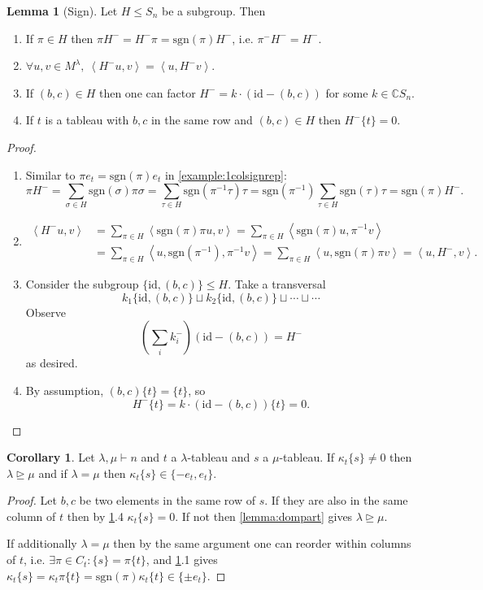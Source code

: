 \documentclass[a4paper]{article}
\newcommand{\sgn}{\text{sgn}}
\newcommand{\la}{\left\langle}
\newcommand{\ra}{\right\rangle}
\newcommand{\C}{\mathbb{C}}
\newcommand{\id}{\text{id}}
\theoremstyle{definition}
\newtheorem{lemma}[defn]{Lemma}
\newtheorem{coro}[defn]{Corollary}
\begin{document}
\begin{lemma}[Sign]
\label{lemma:sign}
Let $H\leq S_n$ be a subgroup. Then
\begin{enumerate}
\item If $\pi\in H$ then $\pi H^-=H^-\pi=\sgn(\pi)H^-$, i.e. $\pi^-H^-=H^-$.
\item $\forall u,v\in M^\lambda,\ \la H^-u,v\ra=\la u,H^-v\ra$.
\item If $(b,c)\in H$ then one can factor $H^-=k\cdot (\id-(b,c))$ for some $k\in\C S_n$.
\item If $t$ is a tableau with $b,c$ in the same row and $(b,c)\in H$ then $H^-\{t\}=0$.
\end{enumerate}
\end{lemma}
\begin{proof}
\begin{enumerate}
\item Similar to $\pi e_t=\sgn(\pi)e_t$ in \ref{example:1colsignrep}:
\[
\pi H^-=\sum_{\sigma\in H}\sgn(\sigma)\pi\sigma=\sum_{\tau\in H}\sgn(\pi^{-1}\tau)\tau=\sgn(\pi^{-1})\sum_{\tau\in H} \sgn(\tau)\tau=\sgn(\pi)H^-.
\]
\item \[
\begin{aligned}
\la H^-u,v \ra&=\sum_{\pi\in H}\la \sgn(\pi)\pi u,v \ra=\sum_{\pi\in H}\la\sgn(\pi)u,\pi^{-1}v\ra\\
&=\sum_{\pi\in H}\la u,\sgn(\pi^{-1}),\pi^{-1}v\ra=\sum_{\pi\in H}\la u,\sgn(\pi)\pi v\ra=\la u,H^-,v\ra.
\end{aligned}
\]
\item Consider the subgroup $\{\id,(b,c)\}\leq H$. Take a transversal
\[
k_1\{\id,(b,c)\}\sqcup k_2\{\id,(b,c)\}\sqcup\cdots\sqcup\cdots
\]
Observe
\[
\left(\sum_i k_i^-\right)(\id-(b,c))=H^-
\]
as desired.
\item By assumption, $(b,c)\{t\}=\{t\}$, so
\[
H^-\{t\}=k\cdot(\id-(b,c))\{t\}=0.
\]
\end{enumerate}
\end{proof}

\begin{coro}
\label{coro:non0kappameansdominance}
Let $\lambda,\mu\vdash n$ and $t$ a $\lambda$-tableau and $s$ a $\mu$-tableau. If $\kappa_t\{s\}\neq 0$ then $\lambda\unrhd\mu$ and if $\lambda=\mu$ then $\kappa_t\{s\}\in\{-e_t,e_t\}$.
\end{coro}
\begin{proof}
Let $b,c$ be two elements in the same row of $s$. If they are also in the same column of $t$ then by \ref{lemma:sign}.4 $\kappa_t\{s\}=0$. If not then \ref{lemma:dompart} gives $\lambda\unrhd\mu$.

If additionally $\lambda=\mu$ then by the same argument one can reorder within columns of $t$, i.e. $\exists\pi\in C_t: \{s\}=\pi\{t\}$, and \ref{lemma:sign}.1 gives $\kappa_t\{s\}=\kappa_t\pi\{t\}=\sgn(\pi)\kappa_t\{t\}\in\{\pm e_t\}$.
\end{proof}
\end{document}
